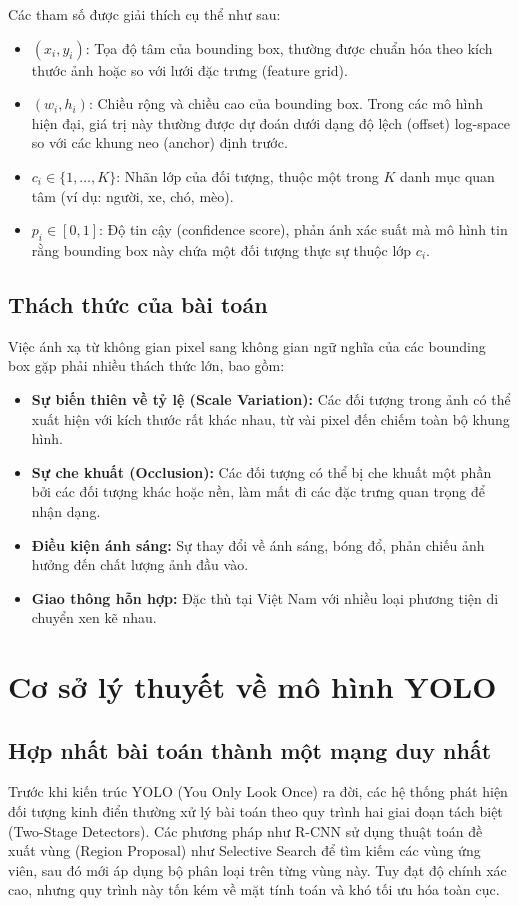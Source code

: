 Các tham số được giải thích cụ thể như sau:
\begin{itemize}
    \item $(x_i, y_i)$: Tọa độ tâm của bounding box, thường được chuẩn hóa theo kích thước ảnh hoặc so với lưới đặc trưng (feature grid).
    \item $(w_i, h_i)$: Chiều rộng và chiều cao của bounding box. Trong các mô hình hiện đại, giá trị này thường được dự đoán dưới dạng độ lệch (offset) log-space so với các khung neo (anchor) định trước.
    \item $c_i \in \{1, \dots, K\}$: Nhãn lớp của đối tượng, thuộc một trong $K$ danh mục quan tâm (ví dụ: người, xe, chó, mèo).
    \item $p_i \in [0, 1]$: Độ tin cậy (confidence score), phản ánh xác suất mà mô hình tin rằng bounding box này chứa một đối tượng thực sự thuộc lớp $c_i$.
\end{itemize}

\subsection{Thách thức của bài toán}
Việc ánh xạ từ không gian pixel sang không gian ngữ nghĩa của các bounding box gặp phải nhiều thách thức lớn, bao gồm:
\begin{itemize}
    \item \textbf{Sự biến thiên về tỷ lệ (Scale Variation):} Các đối tượng trong ảnh có thể xuất hiện với kích thước rất khác nhau, từ vài pixel đến chiếm toàn bộ khung hình.
    \item \textbf{Sự che khuất (Occlusion):} Các đối tượng có thể bị che khuất một phần bởi các đối tượng khác hoặc nền, làm mất đi các đặc trưng quan trọng để nhận dạng.
    \item \textbf{Điều kiện ánh sáng:} Sự thay đổi về ánh sáng, bóng đổ, phản chiếu ảnh hưởng đến chất lượng ảnh đầu vào.
    \item \textbf{Giao thông hỗn hợp:} Đặc thù tại Việt Nam với nhiều loại phương tiện di chuyển xen kẽ nhau.
\end{itemize}


\section{Cơ sở lý thuyết về mô hình YOLO}

\subsection{Hợp nhất bài toán thành một mạng duy nhất}
Trước khi kiến trúc YOLO (You Only Look Once) ra đời, các hệ thống phát hiện đối tượng kinh điển thường xử lý bài toán theo quy trình hai giai đoạn tách biệt (Two-Stage Detectors). Các phương pháp như R-CNN sử dụng thuật toán đề xuất vùng (Region Proposal) như Selective Search để tìm kiếm các vùng ứng viên, sau đó mới áp dụng bộ phân loại trên từng vùng này. Tuy đạt độ chính xác cao, nhưng quy trình này tốn kém về mặt tính toán và khó tối ưu hóa toàn cục.

